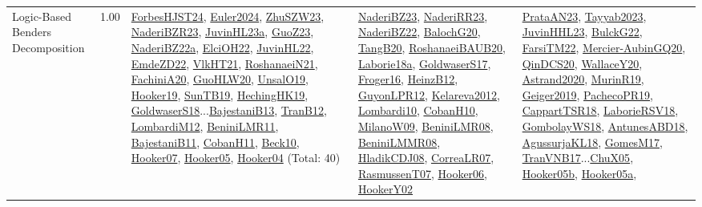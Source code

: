 {\begin{longtable}{p{3cm}r>{\raggedright\arraybackslash}p{6cm}>{\raggedright\arraybackslash}p{6cm}>{\raggedright\arraybackslash}p{8cm}}
\index{Logic-Based Benders Decomposition}\index{Concepts!Logic-Based Benders Decomposition}Logic-Based Benders Decomposition &  1.00 & \hyperref[detail:ForbesHJST24]{ForbesHJST24}, \hyperref[detail:Euler2024]{Euler2024}, \hyperref[detail:ZhuSZW23]{ZhuSZW23}, \hyperref[detail:NaderiBZR23]{NaderiBZR23}, \hyperref[detail:JuvinHL23a]{JuvinHL23a}, \hyperref[detail:GuoZ23]{GuoZ23}, \hyperref[detail:NaderiBZ22a]{NaderiBZ22a}, \hyperref[detail:ElciOH22]{ElciOH22}, \hyperref[detail:JuvinHL22]{JuvinHL22}, \hyperref[detail:EmdeZD22]{EmdeZD22}, \hyperref[detail:VlkHT21]{VlkHT21}, \hyperref[detail:RoshanaeiN21]{RoshanaeiN21}, \hyperref[detail:FachiniA20]{FachiniA20}, \hyperref[detail:GuoHLW20]{GuoHLW20}, \hyperref[detail:UnsalO19]{UnsalO19}, \hyperref[detail:Hooker19]{Hooker19}, \hyperref[detail:SunTB19]{SunTB19}, \hyperref[detail:HechingHK19]{HechingHK19}, \hyperref[detail:GoldwaserS18]{GoldwaserS18}...\hyperref[detail:BajestaniB13]{BajestaniB13}, \hyperref[detail:TranB12]{TranB12}, \hyperref[detail:LombardiM12]{LombardiM12}, \hyperref[detail:BeniniLMR11]{BeniniLMR11}, \hyperref[detail:BajestaniB11]{BajestaniB11}, \hyperref[detail:CobanH11]{CobanH11}, \hyperref[detail:Beck10]{Beck10}, \hyperref[detail:Hooker07]{Hooker07}, \hyperref[detail:Hooker05]{Hooker05}, \hyperref[detail:Hooker04]{Hooker04} (Total: 40) & \hyperref[detail:NaderiBZ23]{NaderiBZ23}, \hyperref[detail:NaderiRR23]{NaderiRR23}, \hyperref[detail:NaderiBZ22]{NaderiBZ22}, \hyperref[detail:BalochG20]{BalochG20}, \hyperref[detail:TangB20]{TangB20}, \hyperref[detail:RoshanaeiBAUB20]{RoshanaeiBAUB20}, \hyperref[detail:Laborie18a]{Laborie18a}, \hyperref[detail:GoldwaserS17]{GoldwaserS17}, \hyperref[detail:Froger16]{Froger16}, \hyperref[detail:HeinzB12]{HeinzB12}, \hyperref[detail:GuyonLPR12]{GuyonLPR12}, \hyperref[detail:Kelareva2012]{Kelareva2012}, \hyperref[detail:Lombardi10]{Lombardi10}, \hyperref[detail:CobanH10]{CobanH10}, \hyperref[detail:MilanoW09]{MilanoW09}, \hyperref[detail:BeniniLMR08]{BeniniLMR08}, \hyperref[detail:BeniniLMMR08]{BeniniLMMR08}, \hyperref[detail:HladikCDJ08]{HladikCDJ08}, \hyperref[detail:CorreaLR07]{CorreaLR07}, \hyperref[detail:RasmussenT07]{RasmussenT07}, \hyperref[detail:Hooker06]{Hooker06}, \hyperref[detail:HookerY02]{HookerY02} & \hyperref[detail:PrataAN23]{PrataAN23}, \hyperref[detail:Tayyab2023]{Tayyab2023}, \hyperref[detail:JuvinHHL23]{JuvinHHL23}, \hyperref[detail:BulckG22]{BulckG22}, \hyperref[detail:FarsiTM22]{FarsiTM22}, \hyperref[detail:Mercier-AubinGQ20]{Mercier-AubinGQ20}, \hyperref[detail:QinDCS20]{QinDCS20}, \hyperref[detail:WallaceY20]{WallaceY20}, \hyperref[detail:Astrand2020]{Astrand2020}, \hyperref[detail:MurinR19]{MurinR19}, \hyperref[detail:Geiger2019]{Geiger2019}, \hyperref[detail:PachecoPR19]{PachecoPR19}, \hyperref[detail:CappartTSR18]{CappartTSR18}, \hyperref[detail:LaborieRSV18]{LaborieRSV18}, \hyperref[detail:GombolayWS18]{GombolayWS18}, \hyperref[detail:AntunesABD18]{AntunesABD18}, \hyperref[detail:AgussurjaKL18]{AgussurjaKL18}, \hyperref[detail:GomesM17]{GomesM17}, \hyperref[detail:TranVNB17]{TranVNB17}...\hyperref[detail:ChuX05]{ChuX05}, \hyperref[detail:Hooker05b]{Hooker05b}, \hyperref[detail:Hooker05a]{Hooker05a}, 
\end{longtable}}
